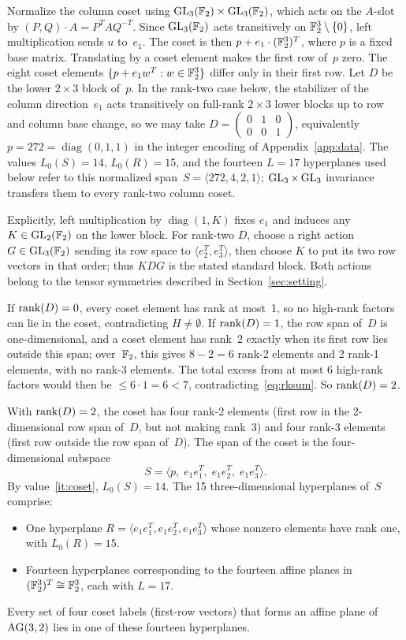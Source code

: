 \documentclass[11pt,a4paper]{article}
\begin{document}
Normalize the column coset using $\operatorname{GL}_3(\mathbb{F}_2)\times\operatorname{GL}_3(\mathbb{F}_2)$, which acts on the $A$-slot by $(P,Q)\cdot A = P^TAQ^{-T}$.  Since $\operatorname{GL}_3(\mathbb{F}_2)$ acts transitively on $\mathbb{F}_2^3\setminus\{0\}$, left multiplication sends $u$ to~$e_1$.  The coset is then $p+e_1\cdot(\mathbb{F}_2^3)^T$, where $p$ is a fixed base matrix.  Translating by a coset element makes the first row of~$p$ zero.  The eight coset elements $\{p+e_1w^T:w\in\mathbb{F}_2^3\}$ differ only in their first row.  Let $D$ be the lower $2\times 3$ block of~$p$.  In the rank-two case below, the stabilizer of the column direction~$e_1$ acts transitively on full-rank $2\times3$ lower blocks up to row and column base change, so we may take $D=\left(\begin{smallmatrix}0&1&0\\0&0&1\end{smallmatrix}\right)$, equivalently $p=272=\operatorname{diag}(0,1,1)$ in the integer encoding of Appendix~\ref{app:data}.  The values $L_0(S)=14$, $L_0(R)=15$, and the fourteen $L=17$ hyperplanes used below refer to this normalized span~$S=\langle272,4,2,1\rangle$; $\operatorname{GL}_3\times\operatorname{GL}_3$ invariance transfers them to every rank-two column coset.

Explicitly, left multiplication by $\operatorname{diag}(1,K)$ fixes
$e_1$ and induces any $K\in\operatorname{GL}_2(\mathbb{F}_2)$ on the lower block.
For rank-two $D$, choose a right action $G\in\operatorname{GL}_3(\mathbb{F}_2)$ sending its
row space to $\langle e_2^T,e_3^T\rangle$, then choose $K$ to put its
two row vectors in that order; thus $KDG$ is the stated standard block.
Both actions belong to the tensor symmetries described in
Section~\ref{sec:setting}.

If $\operatorname{rank}(D)=0$, every coset element has rank at most~1, so no high-rank factors can lie in the coset, contradicting $H\ne\emptyset$.  If $\operatorname{rank}(D)=1$, the row span of~$D$ is one-dimensional, and a coset element has rank~2 exactly when its first row lies outside this span; over~$\mathbb{F}_2$, this gives $8-2=6$ rank-2 elements and 2 rank-1 elements, with no rank-3 elements.  The total excess from at most 6 high-rank factors would then be $\le 6\cdot 1=6<7$, contradicting~\eqref{eq:rksum}.  So $\operatorname{rank}(D)=2$.

With $\operatorname{rank}(D)=2$, the coset has four rank-2 elements (first row in the 2-dimensional row span of~$D$, but not making rank~3) and four rank-3 elements (first row outside the row span of~$D$).  The span of the coset is the four-dimensional subspace
\[
  S = \langle p,\; e_1e_1^T,\; e_1e_2^T,\; e_1e_3^T\rangle.
\]
By value~\ref{it:coset}, $L_0(S)=14$.  The 15 three-dimensional hyperplanes of~$S$ comprise:
\begin{itemize}
  \item One hyperplane $R=\langle e_1e_1^T,e_1e_2^T,e_1e_3^T\rangle$ whose nonzero elements have rank one, with $L_0(R)=15$.
  \item Fourteen hyperplanes corresponding to the fourteen affine planes in $(\mathbb{F}_2^3)^T\cong\mathbb{F}_2^3$, each with $L=17$.
\end{itemize}
Every set of four coset labels (first-row vectors) that forms an affine plane of~$\operatorname{AG}(3,2)$ lies in one of these fourteen hyperplanes.
\end{document}
